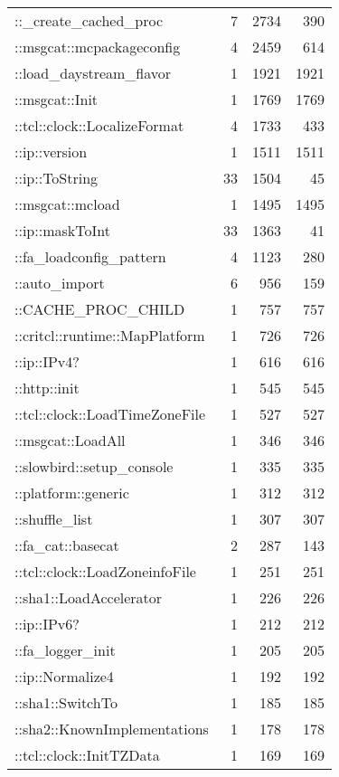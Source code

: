 \documentclass{article}[letter,10pt]
\begin{document}
{{{{\begin{longtable}{l r r r}
          ::\_create\_cached\_proc & 7 & 2734 & 390 \\
          ::msgcat::mcpackageconfig & 4 & 2459 & 614 \\
          ::load\_daystream\_flavor & 1 & 1921 & 1921 \\
          ::msgcat::Init & 1 & 1769 & 1769 \\
          ::tcl::clock::LocalizeFormat & 4 & 1733 & 433 \\
          ::ip::version & 1 & 1511 & 1511 \\
          ::ip::ToString & 33 & 1504 & 45 \\
          ::msgcat::mcload & 1 & 1495 & 1495 \\
          ::ip::maskToInt & 33 & 1363 & 41 \\
          ::fa\_loadconfig\_pattern & 4 & 1123 & 280 \\
          ::auto\_import & 6 & 956 & 159 \\
          ::CACHE\_PROC\_CHILD & 1 & 757 & 757 \\
          ::critcl::runtime::MapPlatform & 1 & 726 & 726 \\
          ::ip::IPv4? & 1 & 616 & 616 \\
          ::http::init & 1 & 545 & 545 \\
          ::tcl::clock::LoadTimeZoneFile & 1 & 527 & 527 \\
          ::msgcat::LoadAll & 1 & 346 & 346 \\
          ::slowbird::setup\_console & 1 & 335 & 335 \\
          ::platform::generic & 1 & 312 & 312 \\
          ::shuffle\_list & 1 & 307 & 307 \\
          ::fa\_cat::basecat & 2 & 287 & 143 \\
          ::tcl::clock::LoadZoneinfoFile & 1 & 251 & 251 \\
          ::sha1::LoadAccelerator & 1 & 226 & 226 \\
          ::ip::IPv6? & 1 & 212 & 212 \\
          ::fa\_logger\_init & 1 & 205 & 205 \\
          ::ip::Normalize4 & 1 & 192 & 192 \\
          ::sha1::SwitchTo & 1 & 185 & 185 \\
          ::sha2::KnownImplementations & 1 & 178 & 178 \\
          ::tcl::clock::InitTZData & 1 & 169 & 169 \\

\end{longtable}}}}}
\end{document}
